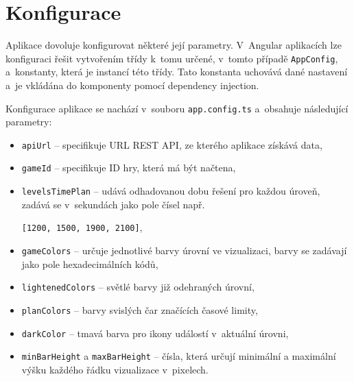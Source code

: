 \documentclass[
  digital, %
  oneside, %
  table,   %
  nolof,     %
  nolot,     %
]{fithesis3}
\begin{document}
\section{Konfigurace} \label{config}
Aplikace dovoluje konfigurovat některé její parametry. V~Angular aplikacích lze konfiguraci řešit vytvořením třídy k~tomu určené, v~tomto případě \verb|AppConfig|, a~konstanty, která je instancí této třídy. Tato konstanta uchovává dané nastavení a~je vkládána do komponenty pomocí dependency injection.\par
Konfigurace aplikace se nachází v~souboru \verb|app.config.ts| a~obsahuje následující parametry:
\begin{itemize}
  \item \verb|apiUrl| – specifikuje URL REST API, ze kterého aplikace získává data,
  \item \verb|gameId| – specifikuje ID hry, která má být načtena,
  \item \verb|levelsTimePlan| – udává odhadovanou dobu řešení pro každou úroveň, zadává se v~sekundách jako pole čísel např.\par
  			\verb|[1200, 1500, 1900, 2100]|,
  \item \verb|gameColors| – určuje jednotlivé barvy úrovní ve vizualizaci, barvy se zadávají jako pole hexadecimálních kódů,
  \item \verb|lightenedColors| – světlé barvy již odehraných úrovní,
  \item \verb|planColors| – barvy svislých čar značících časové limity,
  \item \verb|darkColor| – tmavá barva pro ikony událostí v~aktuální úrovni,
  \item \verb|minBarHeight| a \verb|maxBarHeight| – čísla, která určují minimální a maximální výšku každého řádku vizualizace v~pixelech.

\end{itemize}
\end{document}
